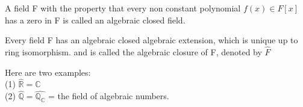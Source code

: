 \documentclass{article}
\newcommand\R{\ensuremath{\mathbb{R}}}
\newcommand\Q{\ensuremath{\mathbb{Q}}}
\newcommand\C{\ensuremath{\mathbb{C}}}
\begin{document}
\begin{Def}
    A field F with the property that every non constant polynomial $f(x) \in F[x]$ has a zero in F is called an algebraic closed field.
\end{Def}
\begin{theorem}
    Every field F has an algebraic closed algebraic extension, which is unique up to ring isomorphism. and is called the algebraic closure of F, denoted by $\hat{F}$
\end{theorem}
\begin{Example}
    Here are two examples:
    \\(1) $\hat{\R}= \C$
    \\(2) $\hat{\Q}= \hat{\Q_\C}$ = the field of algebraic numbers.
\end{Example}
\end{document}
